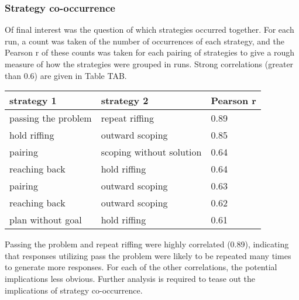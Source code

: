 \subsubsection{Strategy co-occurrence}

Of final interest was the question of which strategies occurred together. For each run, a count was taken of the number of occurrences of each strategy, and the Pearson r of these counts was taken for each pairing of strategies to give a rough measure of how the strategies were grouped in runs. Strong correlations (greater than 0.6) are given in Table TAB.

\begin{table}
    \begin{tabular}{l l l}
        \textbf{strategy 1} & \textbf{strategy 2} & \textbf{Pearson r} \\
        \hline
        passing the problem & repeat riffing & 0.89 \\
        hold riffing & outward scoping & 0.85 \\
        pairing & scoping without solution & 0.64 \\
        reaching back & hold riffing & 0.64 \\
        pairing & outward scoping & 0.63 \\
        reaching back & outward scoping & 0.62 \\
        plan without goal & hold riffing & 0.61 \\
    \end{tabular}
\end{table}

Passing the problem and repeat riffing were highly correlated (0.89), indicating that responses utilizing pass the problem were likely to be repeated many times to generate more responses. For each of the other correlations, the potential implications less obvious. Further analysis is required to tease out the implications of strategy co-occurrence.

